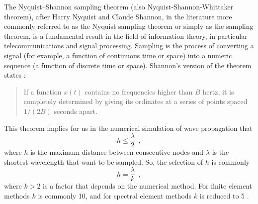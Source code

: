 \documentclass[12pt,letterpaper,landscape]{article}
\begin{document}
The Nyquist–Shannon sampling theorem (also Nyquist-Shannon-Whittaker theorem), after Harry Nyquist and Claude Shannon, in the literature more commonly referred to as the Nyquist sampling theorem or simply as the sampling theorem, is a fundamental result in the field of information theory, in particular telecommunications and signal processing. Sampling is the process of converting a signal (for example, a function of continuous time or space) into a numeric
sequence (a function of discrete time or space). Shannon's version of the theorem states \cite{Shannon}:
\begin{quote}
If a function $x(t)$ contains no frequencies higher than $B$ hertz,
it is completely determined by giving its ordinates at a series of
points spaced $1/(2B)$ seconds apart. 
\end{quote}
This theorem implies for us in the numerical simulation of wave propagation
that 
\[
h\leq\frac{\lambda}{2}\enspace,
\]
 where $h$ is the maximum distance between consecutive nodes and
$\lambda$ is the shortest wavelength that want to be sampled. So,
the selection of $h$ is commonly 
\[
h=\frac{\lambda}{k}\enspace,
\]
 where $k>2$ is a factor that depends on the numerical method. For
finite element methods $k$ is commonly 10, and for spectral element
methods $k$ is reduced to 5 \cite{Komatitsch99}.
\end{document}
